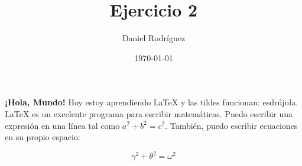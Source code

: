 \documentclass{article}
\title{Ejercicio 2}
\author{Daniel Rodríguez}
\date{\today}
\begin{document}
\maketitle

\textbf{¡Hola, Mundo!} Hoy estoy aprendiendo \LaTeX{} y
las tildes funcionan: esdrújula. \LaTeX{} es un excelente
programa para escribir matemáticas. Puedo escribir una
expresión en una línea tal como $a^2 + b^2 = c^2$. También,
puedo escribir ecuaciones en su propio espacio:

\begin{equation}
    \gamma^2 + \theta^2 = \omega^2
\end{equation}
\end{document}
